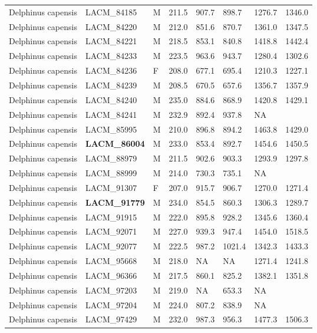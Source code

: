 \begin{longtable}{|p{1.95in}p{1.1in}p{.15in}p{.4in}p{.4in}p{.4in}p{.4in}p{.4in}|}
  Delphinus capensis & LACM\_84185 & M & 211.5 & 907.7 & 898.7 & 1276.7 & 1346.0 \\ 
  Delphinus capensis & LACM\_84220 & M & 212.0 & 851.6 & 870.7 & 1361.0 & 1347.5 \\ 
  Delphinus capensis & LACM\_84221 & M & 218.5 & 853.1 & 840.8 & 1418.8 & 1442.4 \\ 
  Delphinus capensis & LACM\_84233 & M & 223.5 & 963.6 & 943.7 & 1280.4 & 1302.6 \\ 
  Delphinus capensis & LACM\_84236 & F & 208.0 & 677.1 & 695.4 & 1210.3 & 1227.1 \\ 
  Delphinus capensis & LACM\_84239 & M & 208.5 & 670.5 & 657.6 & 1356.7 & 1357.9 \\ 
  Delphinus capensis & LACM\_84240 & M & 235.0 & 884.6 & 868.9 & 1420.8 & 1429.1 \\ 
  Delphinus capensis & LACM\_84241 & M & 232.9 & 892.4 & 937.8 & NA &  \\ 
  Delphinus capensis & LACM\_85995 & M & 210.0 & 896.8 & 894.2 & 1463.8 & 1429.0 \\ 
  Delphinus capensis & \textbf{ LACM\_86004 } & M & 233.0 & 853.4 & 892.7 & 1454.6 & 1450.5 \\ 
  Delphinus capensis & LACM\_88979 & M & 211.5 & 902.6 & 903.3 & 1293.9 & 1297.8 \\ 
  Delphinus capensis & LACM\_88999 & M & 214.0 & 730.3 & 735.1 & NA &  \\ 
  Delphinus capensis & LACM\_91307 & F & 207.0 & 915.7 & 906.7 & 1270.0 & 1271.4 \\ 
  Delphinus capensis & \textbf{ LACM\_91779 } & M & 234.0 & 854.5 & 860.3 & 1306.3 & 1289.7 \\ 
  Delphinus capensis & LACM\_91915 & M & 222.0 & 895.8 & 928.2 & 1345.6 & 1360.4 \\ 
  Delphinus capensis & LACM\_92071 & M & 227.0 & 939.3 & 947.4 & 1454.0 & 1518.5 \\ 
  Delphinus capensis & LACM\_92077 & M & 222.5 & 987.2 & 1021.4 & 1342.3 & 1433.3 \\ 
  Delphinus capensis & LACM\_95668 & M & 218.0 & NA & NA & 1271.4 & 1241.8 \\ 
  Delphinus capensis & LACM\_96366 & M & 217.5 & 860.1 & 825.2 & 1382.1 & 1351.8 \\ 
  Delphinus capensis & LACM\_97203 & M & 219.0 & NA & 653.3 & NA &  \\ 
  Delphinus capensis & LACM\_97204 & M & 224.0 & 807.2 & 838.9 & NA &  \\ 
  Delphinus capensis & LACM\_97429 & M & 232.0 & 987.3 & 956.3 & 1477.3 & 1506.3 \\ 

\end{longtable}
